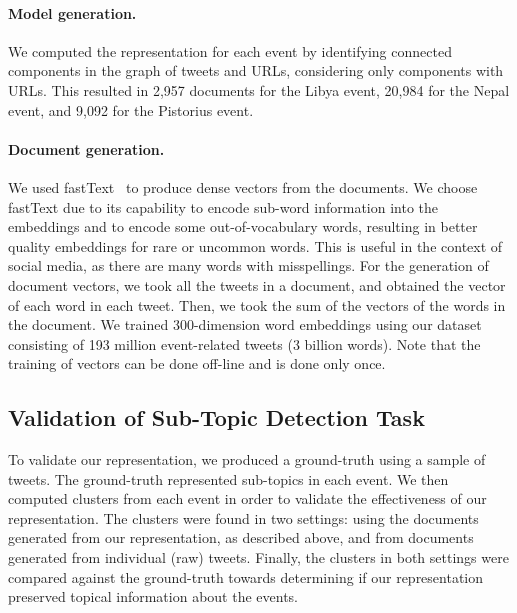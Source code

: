 
\paragraph{Model generation.} 
%
%
We computed the representation for each event by identifying connected
components in the graph of tweets and URLs, considering only components with
URLs.
%
This resulted in 2,957 documents for the Libya event, 20,984 for the Nepal
event, and 9,092 for the Pistorius event.


\paragraph{Document generation.}
%
We used fastText~\cite{bojanowski2017enriching} to produce dense vectors from
the documents.
%
We choose fastText due to its capability to encode sub-word information into the
embeddings and to encode some out-of-vocabulary words, resulting in better
quality embeddings for rare or uncommon words. 
%
This is useful in the context of social media, as there are many words with
misspellings. 
%
For the generation of document vectors, we took all the tweets in a document,
and obtained the vector of each word in each tweet.
%
Then, we took the sum of the vectors of the words in the document.
%
We trained 300-dimension word embeddings using our dataset consisting of 193
million event-related tweets (3 billion words).
%
Note that the training of vectors can be done off-line and is done only once.


\subsection{Validation of Sub-Topic Detection Task}

To validate our representation, we produced a ground-truth using a sample of
tweets.
%
The ground-truth represented sub-topics in each event. 
%
We then computed clusters from each event in order to validate the effectiveness
of our representation.
%
The clusters were found in two settings: using the documents generated from our
representation, as described above, and from documents generated from individual
(raw) tweets.
%
Finally, the clusters in both settings were compared against the ground-truth
towards determining if our representation preserved topical information about
the events.

